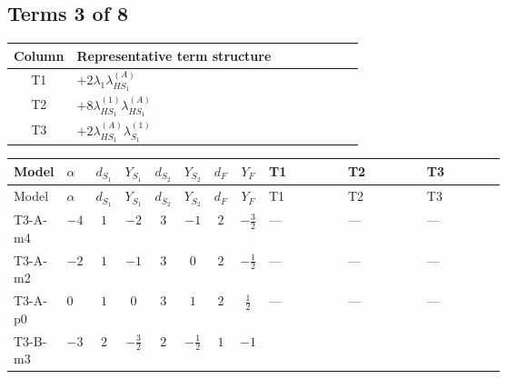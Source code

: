 \documentclass[8pt]{article}
\begin{document}
\begin{landscape}
\subsection*{Terms 3 of 8}
\begin{center}
\begin{tabular}{@{}c >{\raggedright\arraybackslash}p{0.82\linewidth}@{}}
\toprule
Column & Representative term structure \\
\midrule
T1 & \(\displaystyle +2 {\lambda_1} {\lambda_{HS_1}^{(A)}}\) \\
\midrule
T2 & \(\displaystyle +8 {\lambda_{HS_1}^{(1)}} {\lambda_{HS_1}^{(A)}}\) \\
\midrule
T3 & \(\displaystyle +2 {\lambda_{HS_1}^{(A)}} {\lambda_{S_1}^{(1)}}\) \\
\midrule
\bottomrule
\end{tabular}
\end{center}
\smallskip
\tiny
\begin{longtable}{@{}llcccccc >{\raggedright\arraybackslash}p{0.21\linewidth} >{\raggedright\arraybackslash}p{0.21\linewidth} >{\raggedright\arraybackslash}p{0.21\linewidth}@{}}
\toprule
Model & $\alpha$ & $d_{S_1}$ & $Y_{S_1}$ & $d_{S_2}$ & $Y_{S_2}$ & $d_F$ & $Y_F$ & T1 & T2 & T3 \\
\midrule
\endfirsthead
\toprule
Model & $\alpha$ & $d_{S_1}$ & $Y_{S_1}$ & $d_{S_2}$ & $Y_{S_2}$ & $d_F$ & $Y_F$ & T1 & T2 & T3 \\
\midrule
\endhead
T3-A-m4 & $-4$ & $1$ & $-2$ & $3$ & $-1$ & $2$ & $-\frac{3}{2}$ & --- & --- & --- \\
\midrule
T3-A-m2 & $-2$ & $1$ & $-1$ & $3$ & $0$ & $2$ & $-\frac{1}{2}$ & --- & --- & --- \\
\midrule
T3-A-p0 & $0$ & $1$ & $0$ & $3$ & $1$ & $2$ & $\frac{1}{2}$ & --- & --- & --- \\
\midrule
T3-B-m3 & $-3$ & $2$ & $-\frac{3}{2}$ & $2$ & $-\frac{1}{2}$ & $1$ & $-1$ & \scriptsize\adjustbox{max width=\linewidth}{$\begin{gathered} +2 {\lambda_1} {\lambda_{HS_1}^{(A)}}\end{gathered}$} & \scriptsize\adjustbox{max width=\linewidth}{$\begin{gathered} +8 {\lambda_{HS_1}^{(1)}} {\lambda_{HS_1}^{(A)}}\end{gathered}$} & \scriptsize\adjustbox{max width=\linewidth}{$\begin{gathered} +2 {\lambda_{HS_1}^{(A)}} {\lambda_{S_1}^{(1)}}\end{gathered}$} \\

\end{longtable}
\end{landscape}
\end{document}
